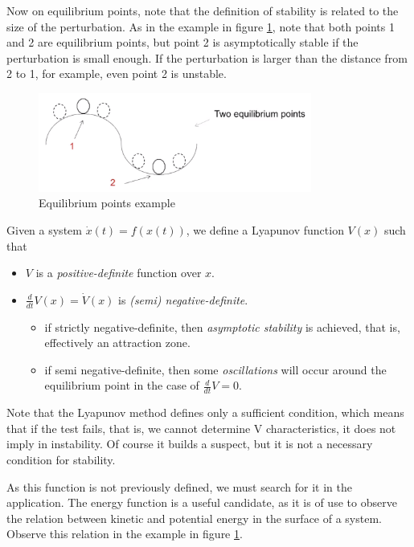 Now on equilibrium points, note that the definition of stability is related to the size of the perturbation. As in the example in figure \ref{fig:figures-lyapunov_equilibrium_points-png}, note that both points 1 and 2 are equilibrium points, but point 2 is asymptotically stable if the perturbation is small enough. If the perturbation is larger than the distance from 2 to 1, for example, even point 2 is unstable.

\begin{figure}[h]
    \centering
    \includegraphics[width=0.8\textwidth]{figures/lyapunov_equilibrium_points.png}
    \caption{Equilibrium points example}
    \label{fig:figures-lyapunov_equilibrium_points-png}
\end{figure}

Given a system $\dot{x}(t)=f\left( x(t) \right) $, we define a Lyapunov function $V\left( x \right) $ such that
\begin{itemize}
    \item $V$ is a \emph{positive-definite} function over $x$.
    \item $\frac{d}{dt}V\left( x \right) =\dot{V}\left( x \right)$ is \emph{(semi) negative-definite}.
	\begin{itemize}
	    \item if strictly negative-definite, then \emph{asymptotic stability} is achieved, that is, effectively an attraction zone.
	    \item if semi negative-definite, then some \emph{oscillations} will occur around the equilibrium point in the case of $\frac{d}{dt}V = 0$.
	\end{itemize}
\end{itemize}

Note that the Lyapunov method defines only a sufficient condition, which means that if the test fails, that is, we cannot determine V characteristics, it does not imply in instability. Of course it builds a suspect, but it is not a necessary condition for stability.

As this function is not previously defined, we must search for it in the application. The energy function is a useful candidate, as it is of use to observe the relation between kinetic and potential energy in the surface of a system. Observe this relation in the example in figure \ref{fig:figures-lyapunov_equilibrium_points-png}.

